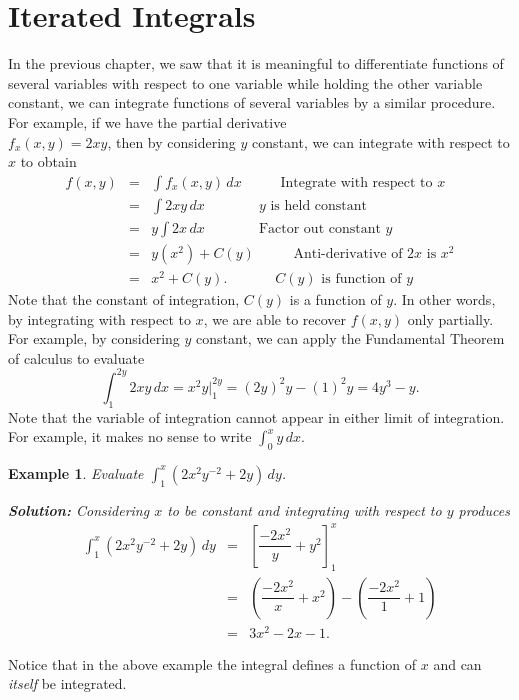 \documentclass[titlepage,a4paper,12pt]{report}
\newtheorem{example}{Example}[section]
\begin{document}
\section{Iterated Integrals}
In the previous chapter, we saw that it is meaningful to differentiate functions of several variables with respect to one variable while holding the other variable constant, we can integrate functions of several variables by a similar procedure. For example, if we have the partial derivative\\ $f_x(x,y)=2xy$, then by considering $y$ constant, we can integrate with respect to $x$ to obtain 
\begin{eqnarray*}
f(x,y) &=& \int f_x(x,y)\, dx  \quad ~~~~~~~~ \mbox{Integrate with respect to $x$} \\
&=& \int 2xy \, dx  \quad ~~~~~~~~~~~~~\mbox{$y$ is held constant}\\
&=& y\int 2x\, dx \quad ~~~~~~~~~~~~~ \mbox{Factor out constant $y$} \\
&=&y(x^2)+C(y) \quad ~~~~~~~~ \mbox{Anti-derivative of $2x$ is $x^2$}\\
&=& x^2+C(y). \quad ~~~~~~~~~~~\mbox{$C(y)$ is function of $y$}
\end{eqnarray*}
Note that the constant of integration, $C(y)$ is a function of $y$. In other words, by integrating with respect to $x$, we are able to recover $f(x,y)$ only partially. For example, by considering $y$ constant, we can apply the Fundamental Theorem of calculus to evaluate 
\[\int _1 ^{2y} 2xy\, dx =x^2y \Biggl |_1^{2y}=(2y)^2y-(1)^2y=4y^3-y.\]
Note that the variable of integration cannot appear in either limit of integration. For example, it makes no sense to write $\displaystyle \int _0^x y\, dx$.
\begin{example}
Evaluate $\displaystyle \int _1^x (2x^2y^{-2}+2y)\, dy$.

\noindent \textbf{Solution:} Considering $x$ to be constant and integrating with respect to $y$ produces 
\begin{eqnarray*}
\int _1^x (2x^2y^{-2}+2y)\, dy &=& \left[\dfrac{-2x^2}{y}+y^2\right] _1^x \\
&=& \left(\dfrac{-2x^2}{x}+x^2\right)-\left(\dfrac{-2x^2}{1}+1\right)\\
&=& 3x^2-2x-1.
\end{eqnarray*}
\end{example}
\noindent Notice that in the above example the integral defines a function of $x$ and can \textit{itself} be integrated.
\end{document}

